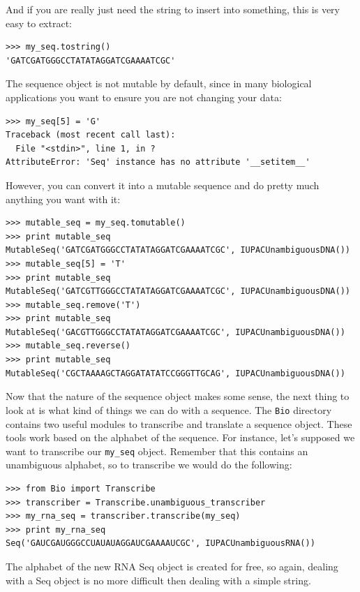 \documentclass{report}
\begin{document}
And if you are really just need the string to insert into something, this is very easy to extract:

\begin{verbatim}
>>> my_seq.tostring()
'GATCGATGGGCCTATATAGGATCGAAAATCGC'
\end{verbatim} 

The sequence object is not mutable by default, since in many biological applications you want to ensure you are not changing your data:

\begin{verbatim}
>>> my_seq[5] = 'G'
Traceback (most recent call last):
  File "<stdin>", line 1, in ?
AttributeError: 'Seq' instance has no attribute '__setitem__'
\end{verbatim}

However, you can convert it into a mutable sequence and do pretty much anything you want with it:

\begin{verbatim}
>>> mutable_seq = my_seq.tomutable()
>>> print mutable_seq
MutableSeq('GATCGATGGGCCTATATAGGATCGAAAATCGC', IUPACUnambiguousDNA())
>>> mutable_seq[5] = 'T'
>>> print mutable_seq
MutableSeq('GATCGTTGGGCCTATATAGGATCGAAAATCGC', IUPACUnambiguousDNA())
>>> mutable_seq.remove('T')
>>> print mutable_seq
MutableSeq('GACGTTGGGCCTATATAGGATCGAAAATCGC', IUPACUnambiguousDNA())
>>> mutable_seq.reverse()
>>> print mutable_seq
MutableSeq('CGCTAAAAGCTAGGATATATCCGGGTTGCAG', IUPACUnambiguousDNA())
\end{verbatim}

Now that the nature of the sequence object makes some sense, the next
thing to look at is what kind of things we can do with a sequence. The
\verb|Bio| directory contains two useful modules to transcribe and
translate a sequence object. These tools work based on the alphabet of
the sequence. For instance, let's supposed we want to transcribe our
\verb|my_seq| object. Remember that this contains an unambiguous
alphabet, so to transcribe we would do the following:

\begin{verbatim}
>>> from Bio import Transcribe
>>> transcriber = Transcribe.unambiguous_transcriber
>>> my_rna_seq = transcriber.transcribe(my_seq)
>>> print my_rna_seq
Seq('GAUCGAUGGGCCUAUAUAGGAUCGAAAAUCGC', IUPACUnambiguousRNA())
\end{verbatim}

The alphabet of the new RNA Seq object is created for free, so again, dealing with a Seq object is no more difficult then dealing with a simple string.
\end{document}
